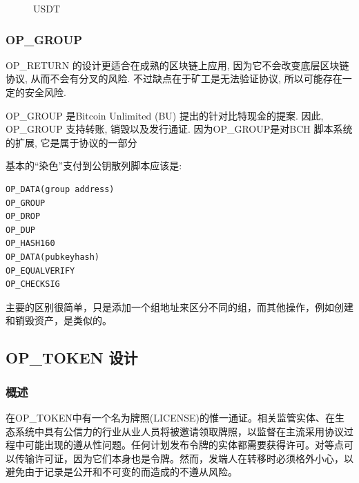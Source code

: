 \documentclass[a4paper,11pt]{article}
\begin{document}
\begin{figure}[hbt]
	\centerline{%
	}
\caption{USDT}
\end{figure}




\subsubsection*{OP\_GROUP}
OP\_RETURN 的设计更适合在成熟的区块链上应用, 因为它不会改变底层区块链协议, 从而不会有分叉的风险. 不过缺点在于矿工是无法验证协议, 所以可能存在一定的安全风险.

OP\_GROUP\cite{OP_GROUP} 是Bitcoin Unlimited (BU) 提出的针对比特现金\cite{BCH}的提案. 因此, OP\_GROUP 支持转账, 销毁以及发行通证. 因为OP\_GROUP是对BCH 脚本系统的扩展, 它是属于协议的一部分	 


基本的“染色”支付到公钥散列脚本应该是:

\lstset{basicstyle=\tiny,style=myListStyle}
\begin{lstlisting}[numbers=none]
OP_DATA(group address)
OP_GROUP
OP_DROP
OP_DUP
OP_HASH160
OP_DATA(pubkeyhash)
OP_EQUALVERIFY
OP_CHECKSIG
\end{lstlisting}

主要的区别很简单，只是添加一个组地址来区分不同的组，而其他操作，例如创建和销毁资产，是类似的。


\subsection{OP\_TOKEN 设计}

\subsubsection{概述}


在OP\_TOKEN中有一个名为牌照(LICENSE)的惟一通证。相关监管实体、在生态系统中具有公信力的行业从业人员将被邀请领取牌照，以监督在主流采用协议过程中可能出现的遵从性问题。任何计划发布令牌的实体都需要获得许可。对等点可以传输许可证，因为它们本身也是令牌。然而，发端人在转移时必须格外小心，以避免由于记录是公开和不可变的而造成的不遵从风险。
\end{document}
